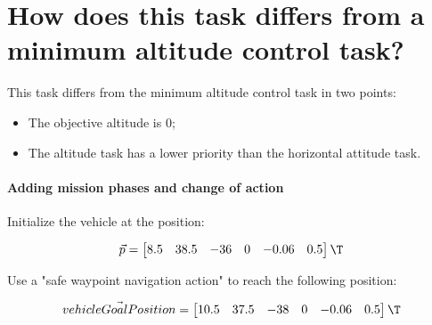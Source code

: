 \begin{parts}
\begin{solutionorbox}
		\end{solutionorbox}

		\part{How does this task differs from a minimum altitude control
		task?}

		\begin{solutionorbox}
			This task differs from the minimum altitude control task
			in two points:
			\begin{itemize}
				\item The objective altitude is $0$;
				\item The altitude task has a lower priority
					than the horizontal attitude task.
			\end{itemize}

		\end{solutionorbox}
	\end{parts}

	\subsection{Adding mission phases and change of action}
	\question

	Initialize the vehicle at the position:

	\begin{displaymath}
		\vec{p}
		=
		\begin{bmatrix}
			8.5 & 38.5 & -36 & 0 & -0.06 & 0.5
		\end{bmatrix}\T
	\end{displaymath}

	Use a "safe waypoint navigation action" to reach the following
	position:

	\begin{displaymath}
		\vec{vehicleGoalPosition}
		=
		\begin{bmatrix}
			10.5 & 37.5 & -38 & 0 & -0.06 & 0.5
		\end{bmatrix}\T
	\end{displaymath}

